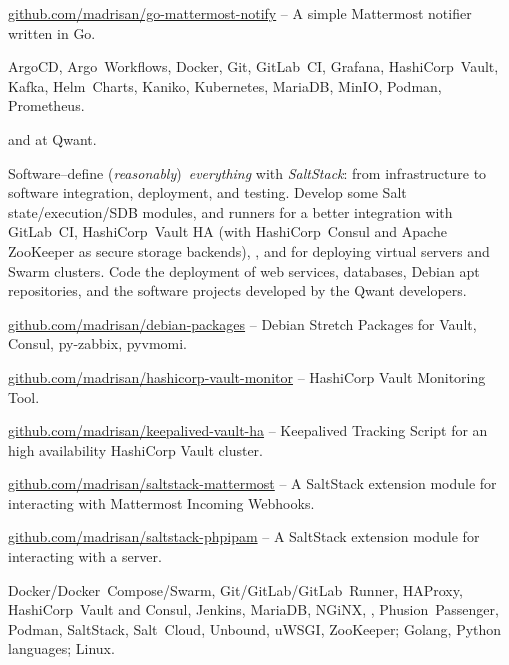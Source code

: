 \smallskip\noindent
\software
\url{github.com/madrisan/go-mattermost-notify} --
A simple Mattermost notifier written in Go.

\smallskip\noindent
\technologies
ArgoCD, Argo~Workflows, Docker, Git, GitLab~CI, Grafana, HashiCorp~Vault,
Kafka, Helm~Charts, Kaniko, Kubernetes, MariaDB, MinIO, Podman, %
Prometheus.



 and  at Qwant.

\smallskip\noindent
\tasks
Software--define ({\it reasonably}\/)~{\it everything\/} with {\it SaltStack\/}:
from infrastructure to software integration, deployment, and testing.
Develop some Salt state/execution/SDB modules, and runners for a better
integration with GitLab~CI, HashiCorp~Vault HA (with HashiCorp~Consul and
Apache ZooKeeper as secure storage backends), \phpIPAM{}, and for deploying
virtual servers and Swarm clusters.
Code the deployment of web services, databases, Debian apt repositories, and the
software projects developed by the Qwant developers.

\smallskip\noindent
\software
\url{github.com/madrisan/debian-packages} --
Debian Stretch Packages for Vault, Consul, py-zabbix, pyvmomi.

\noindent
\url{github.com/madrisan/hashicorp-vault-monitor} --
HashiCorp Vault Monitoring Tool.

\noindent
\url{github.com/madrisan/keepalived-vault-ha} --
Keepalived Tracking Script for an high availability HashiCorp Vault cluster.

\noindent
\url{github.com/madrisan/saltstack-mattermost} --
A SaltStack extension module for interacting with Mattermost Incoming Webhooks.

\noindent
\url{github.com/madrisan/saltstack-phpipam} --
A SaltStack extension module for interacting with a \phpIPAM{} server.


\smallskip\noindent
\technologies
Docker/Docker~Compose/Swarm, Git/GitLab/GitLab~Runner, HAProxy,
HashiCorp~Vault and Consul, Jenkins, MariaDB, NGiNX, \phpIPAM,
Phusion~Passenger, Podman, SaltStack, Salt~Cloud, Unbound, uWSGI, ZooKeeper;
Golang, Python languages; Linux.

